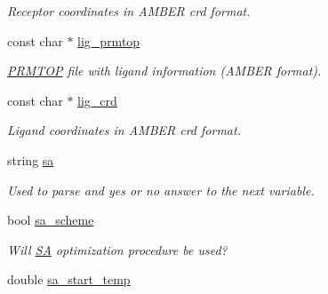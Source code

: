 \begin{DoxyCompactItemize}
\begin{DoxyCompactList}\small\item\em Receptor coordinates in AMBER crd format. \item\end{DoxyCompactList}\item 
\hypertarget{classPARSER_a3703a65df242813e019d61e5c6465ad1}{
const char $\ast$ \hyperlink{classPARSER_a3703a65df242813e019d61e5c6465ad1}{lig\_\-prmtop}}
\label{classPARSER_a3703a65df242813e019d61e5c6465ad1}

\begin{DoxyCompactList}\small\item\em \hyperlink{classPRMTOP}{PRMTOP} file with ligand information (AMBER format). \item\end{DoxyCompactList}\item 
\hypertarget{classPARSER_af5f1fbb821b6540a17523f0b0181547a}{
const char $\ast$ \hyperlink{classPARSER_af5f1fbb821b6540a17523f0b0181547a}{lig\_\-crd}}
\label{classPARSER_af5f1fbb821b6540a17523f0b0181547a}

\begin{DoxyCompactList}\small\item\em Ligand coordinates in AMBER crd format. \item\end{DoxyCompactList}\item 
\hypertarget{classPARSER_a8cdad7cd9572684c65c2f4b2fb856883}{
string \hyperlink{classPARSER_a8cdad7cd9572684c65c2f4b2fb856883}{sa}}
\label{classPARSER_a8cdad7cd9572684c65c2f4b2fb856883}

\begin{DoxyCompactList}\small\item\em Used to parse and yes or no answer to the next variable. \item\end{DoxyCompactList}\item 
\hypertarget{classPARSER_adbe3193ae5abdcb1fce15185cd5026bb}{
bool \hyperlink{classPARSER_adbe3193ae5abdcb1fce15185cd5026bb}{sa\_\-scheme}}
\label{classPARSER_adbe3193ae5abdcb1fce15185cd5026bb}

\begin{DoxyCompactList}\small\item\em Will \hyperlink{classSA}{SA} optimization procedure be used? \item\end{DoxyCompactList}\item 
\hypertarget{classPARSER_afaf618e4145a7f91eb4b65bcd80c889a}{
double \hyperlink{classPARSER_afaf618e4145a7f91eb4b65bcd80c889a}{sa\_\-start\_\-temp}}
\label{classPARSER_afaf618e4145a7f91eb4b65bcd80c889a}


\end{DoxyCompactItemize}

